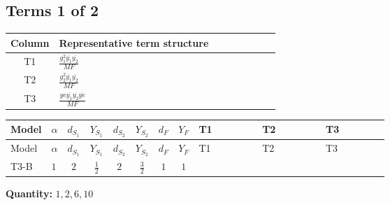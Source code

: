 \documentclass[8pt]{article}
\begin{document}
\begin{landscape}
\subsection*{Terms 1 of 2}
\begin{center}
\begin{tabular}{@{}c >{\raggedright\arraybackslash}p{0.82\linewidth}@{}}
\toprule
Column & Representative term structure \\
\midrule
T1 & \(\displaystyle \frac{g_{1}^{2} \overline{y_{1}} \overline{y_{2}}}{MF}\) \\
\midrule
T2 & \(\displaystyle \frac{g_{2}^{2} \overline{y_{1}} \overline{y_{2}}}{MF}\) \\
\midrule
T3 & \(\displaystyle \frac{ye \overline{y_{1}} \overline{y_{2}} \overline{ye}}{MF}\) \\
\midrule
\bottomrule
\end{tabular}
\end{center}
\smallskip
\tiny
\begin{longtable}{@{}llcccccc >{\raggedright\arraybackslash}p{0.21\linewidth} >{\raggedright\arraybackslash}p{0.21\linewidth} >{\raggedright\arraybackslash}p{0.21\linewidth}@{}}
\toprule
Model & $\alpha$ & $d_{S_1}$ & $Y_{S_1}$ & $d_{S_2}$ & $Y_{S_2}$ & $d_F$ & $Y_F$ & T1 & T2 & T3 \\
\midrule
\endfirsthead
\toprule
Model & $\alpha$ & $d_{S_1}$ & $Y_{S_1}$ & $d_{S_2}$ & $Y_{S_2}$ & $d_F$ & $Y_F$ & T1 & T2 & T3 \\
\midrule
\endhead
T3-B & $1$ & $2$ & $\frac{1}{2}$ & $2$ & $\frac{3}{2}$ & $1$ & $1$ & \scriptsize\adjustbox{max width=\linewidth}{$\begin{gathered} \frac{3 g_{1}^{2} \overline{y_{1}} \overline{y_{2}}}{4 MF}\end{gathered}$} & \scriptsize\adjustbox{max width=\linewidth}{$\begin{gathered} \frac{3 g_{2}^{2} \overline{y_{1}} \overline{y_{2}}}{8 MF}\end{gathered}$} & \scriptsize\adjustbox{max width=\linewidth}{$\begin{gathered} - \frac{ye \overline{y_{1}} \overline{y_{2}} \overline{ye}}{8 MF}\end{gathered}$} \\
\midrule
\bottomrule
\end{longtable}
\clearpage
\noindent\textbf{Quantity: }$\mathrm{1,2,6,10}$\par\smallskip

\end{landscape}
\end{document}
